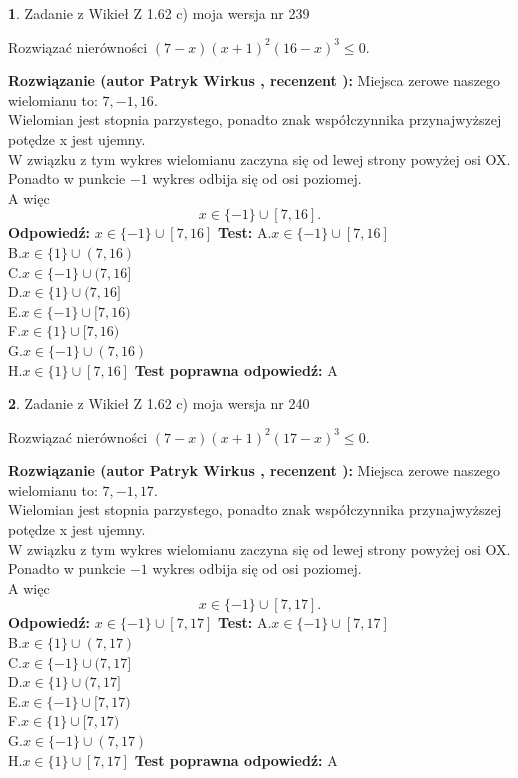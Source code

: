 \documentclass[12pt, a4paper]{article}
\theoremstyle{definition} %
\newtheorem{zad}{}
\newcommand{\zadStart}[1]{\begin{zad}#1\newline}
\newcommand{\zadStop}{\end{zad}}
\newcommand{\rozwStart}[2]{\noindent \textbf{Rozwiązanie (autor #1 , recenzent #2): }\newline}
\newcommand{\rozwStop}{\newline}
\newcommand{\odpStart}{\noindent \textbf{Odpowiedź:}\newline}
\newcommand{\odpStop}{\newline}
\newcommand{\testStart}{\noindent \textbf{Test:}\newline}
\newcommand{\testStop}{\newline}
\newcommand{\kluczStart}{\noindent \textbf{Test poprawna odpowiedź:}\newline}
\newcommand{\kluczStop}{\newline}
\begin{document}
\zadStart{Zadanie z Wikieł Z 1.62 c) moja wersja nr 239}

Rozwiązać nierówności $(7-x)(x+1)^{2}(16-x)^{3}\le0$.
\zadStop
\rozwStart{Patryk Wirkus}{}
Miejsca zerowe naszego wielomianu to: $7, -1, 16$.\\
Wielomian jest stopnia parzystego, ponadto znak współczynnika przy\linebreak najwyższej potędze x jest ujemny.\\ W związku z tym wykres wielomianu zaczyna się od lewej strony powyżej osi OX.\\
Ponadto w punkcie $-1$ wykres odbija się od osi poziomej.\\
A więc $$x \in \{-1\} \cup [7,16].$$
\rozwStop
\odpStart
$x \in \{-1\} \cup [7,16]$
\odpStop
\testStart
A.$x \in \{-1\} \cup [7,16]$\\
B.$x \in \{1\} \cup (7,16)$\\
C.$x \in \{-1\} \cup (7,16]$\\
D.$x \in \{1\} \cup (7,16]$\\
E.$x \in \{-1\} \cup [7,16)$\\
F.$x \in \{1\} \cup [7,16)$\\
G.$x \in \{-1\} \cup (7,16)$\\
H.$x \in \{1\} \cup [7,16]$
\testStop
\kluczStart
A
\kluczStop



\zadStart{Zadanie z Wikieł Z 1.62 c) moja wersja nr 240}

Rozwiązać nierówności $(7-x)(x+1)^{2}(17-x)^{3}\le0$.
\zadStop
\rozwStart{Patryk Wirkus}{}
Miejsca zerowe naszego wielomianu to: $7, -1, 17$.\\
Wielomian jest stopnia parzystego, ponadto znak współczynnika przy\linebreak najwyższej potędze x jest ujemny.\\ W związku z tym wykres wielomianu zaczyna się od lewej strony powyżej osi OX.\\
Ponadto w punkcie $-1$ wykres odbija się od osi poziomej.\\
A więc $$x \in \{-1\} \cup [7,17].$$
\rozwStop
\odpStart
$x \in \{-1\} \cup [7,17]$
\odpStop
\testStart
A.$x \in \{-1\} \cup [7,17]$\\
B.$x \in \{1\} \cup (7,17)$\\
C.$x \in \{-1\} \cup (7,17]$\\
D.$x \in \{1\} \cup (7,17]$\\
E.$x \in \{-1\} \cup [7,17)$\\
F.$x \in \{1\} \cup [7,17)$\\
G.$x \in \{-1\} \cup (7,17)$\\
H.$x \in \{1\} \cup [7,17]$
\testStop
\kluczStart
A
\kluczStop
\end{document}

